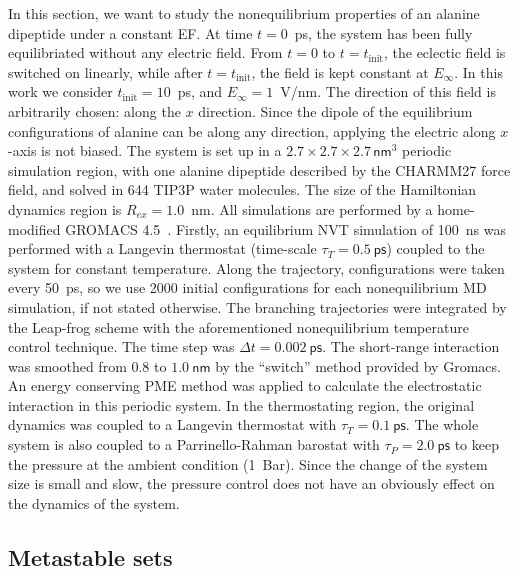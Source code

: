 \documentclass[a4paper,preprint,unsortedaddress,onecolumn]{revtex4-1}
\begin{document}
In this section,
we want to study the nonequilibrium properties of an alanine dipeptide
under a constant EF. At time $t=0$~ps, the system
has been fully equilibriated without any electric field. From $t=0$ to
$t=t_{\textrm{init}}$, the eclectic field is switched on linearly, while
after $t=t_{\textrm{init}}$, the field is kept constant at
$E_{\infty}$.  In this work we consider $t_{\textrm{init}} = 10$~ps,
and $E_{\infty} = 1$~V/nm.
The direction of this field is arbitrarily chosen: along the
$x$ direction. Since the dipole of the equilibrium configurations of
alanine can be along any direction, applying the electric along $x$-axis is
not biased.
The system is set up in a $2.7\times 2.7\times
2.7\, \textsf{nm}^3$ periodic simulation region, with one alanine dipeptide
described by the CHARMM27 force field, and solved in 644 TIP3P
water molecules.
The size of the  Hamiltonian dynamics region is $R_{ex} = 1.0$~nm.
All simulations are performed by a home-modified GROMACS 4.5~\cite{pronk2013gromacs}.
Firstly, an equilibrium NVT simulation of
100~\textsf{ns} was performed with a Langevin thermostat (time-scale
$\tau_T = 0.5~\textsf{ps}$) coupled to the system for constant
temperature.  Along the trajectory, configurations were taken every
50~\textsf{ps}, so we use 2000 initial configurations for each nonequilibrium
MD simulation, if not stated otherwise.
The branching trajectories were integrated by the
Leap-frog scheme with the aforementioned nonequilibrium
temperature control technique.  The
time step was $\Delta t = 0.002~\textsf{ps}$. The short-range
interaction was smoothed from $0.8$ to $1.0~\textsf{nm}$ by the
``switch'' method provided by Gromacs.  An energy conserving PME
method was applied to calculate the electrostatic interaction in this
periodic system. In the thermostating region, the original dynamics was
coupled to a Langevin thermostat with $\tau_T = 0.1~\textsf{ps}$.
The whole system is also coupled to a Parrinello-Rahman barostat with $\tau_P = 2.0~\textsf{ps}$ to keep
the pressure at the ambient condition (1~Bar). Since the
change of the system size is small and slow, the pressure control
does not have an obviously effect on the
dynamics of the system.



\subsection{Metastable sets}
\end{document}

